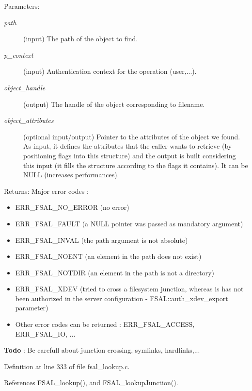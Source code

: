 \begin{Desc}
\item[Parameters:]
\begin{description}
\item[{\em path}](input) The path of the object to find. \item[{\em p\_\-context}](input) Authentication context for the operation (user,...). \item[{\em object\_\-handle}](output) The handle of the object corresponding to filename. \item[{\em object\_\-attributes}](optional input/output) Pointer to the attributes of the object we found. As input, it defines the attributes that the caller wants to retrieve (by positioning flags into this structure) and the output is built considering this input (it fills the structure according to the flags it contains). It can be NULL (increases performances).\end{description}
\end{Desc}
\begin{Desc}
\item[Returns:]Major error codes :\begin{itemize}
\item ERR\_\-FSAL\_\-NO\_\-ERROR (no error)\item ERR\_\-FSAL\_\-FAULT (a NULL pointer was passed as mandatory argument)\item ERR\_\-FSAL\_\-INVAL (the path argument is not absolute)\item ERR\_\-FSAL\_\-NOENT (an element in the path does not exist)\item ERR\_\-FSAL\_\-NOTDIR (an element in the path is not a directory)\item ERR\_\-FSAL\_\-XDEV (tried to cross a filesystem junction, whereas is has not been authorized in the server configuration - FSAL::auth\_\-xdev\_\-export parameter)\item Other error codes can be returned : ERR\_\-FSAL\_\-ACCESS, ERR\_\-FSAL\_\-IO, ...\end{itemize}
\end{Desc}


\begin{Desc}
\item[{\bf Todo}]: Be carefull about junction crossing, symlinks, hardlinks,...\end{Desc}


Definition at line 333 of file fsal\_\-lookup.c.

References FSAL\_\-lookup(), and FSAL\_\-lookup\-Junction().